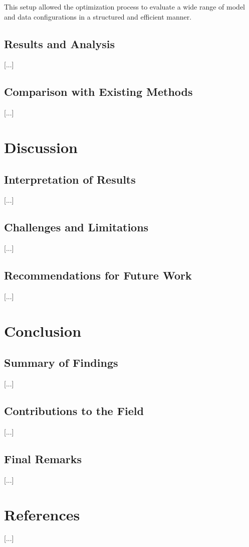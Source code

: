 \documentclass{SGGW-thesis-EN}
\begin{document}
This setup allowed the optimization process to evaluate a wide range of model and data configurations in a structured and efficient manner.

\section{Results and Analysis}
[...]

\section{Comparison with Existing Methods}
[...]

\chapter{Discussion}

\section{Interpretation of Results}
[...]

\section{Challenges and Limitations}
[...]

\section{Recommendations for Future Work}
[...]

\chapter{Conclusion}

\section{Summary of Findings}
[...]

\section{Contributions to the Field}
[...]

\section{Final Remarks}
[...]

\chapter{References}
[...]
\end{document}

